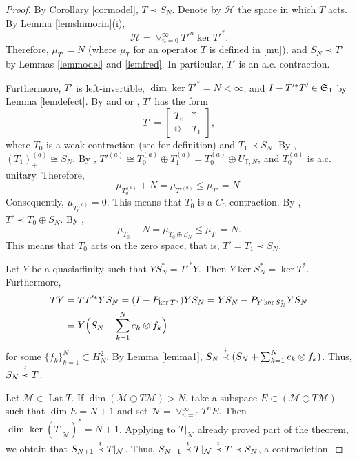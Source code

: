 \documentclass[a4paper,oneside,11pt]{amsart}
\numberwithin{equation}{section}
\theoremstyle{plain}
\theoremstyle{definition}
\begin{document}
\begin{proof} By Corollary \ref{cormodel}, $T\prec S_N$. Denote by $\mathcal H$ the space in which $T$ acts. By Lemma  \ref{lemshimorin}(i),  
\begin{equation*} \mathcal H=\vee_{n=0}^\infty T'^n\ker T'^*.
\end{equation*}
Therefore,  $\mu_{T'}=N$ (where $\mu_T$ for an operator $T$ is defined in \eqref{mu}), and $S_N\prec T'$ by Lemmas \ref{lemmodel} and \ref{lemfred}. In particular, $T'$ is an a.c. contraction. 

Furthermore, $T'$ is left-invertible, $\dim\ker T'^*=N<\infty$, and $I-T'^*T'\in\frak S_1$ by Lemma \ref{lemdefect}. By \cite{uchiyama84} and \cite{uchiyama83}  or \cite{takahashi84}, $T'$ has the form  
\begin{equation*} T'=\left[\begin{matrix}T_0 & * \\ \mathbb O & T_1\end{matrix}\right],
\end{equation*}
where $T_0$ is a weak contraction (see {\cite[Ch. VIII]{nfbk}} for definition) and $T_1\prec S_N$. 
By {\cite[Lemma 2.1]{gamalshiftindex}}, $(T_1)^{(a)}_+\cong S_N$. 
 By  {\cite[Ch. IX.1]{nfbk}}, 
$T'^{(a)}\cong T_0^{(a)}\oplus T_1^{(a)}=T_0^{(a)}\oplus U_{\mathbb T,N}$, and $T_0^{(a)}$ is a.c. unitary. Therefore, 
\begin{equation*} \mu_{T_0^{(a)}} + N =\mu_{T'^{(a)}}\leq \mu_{T'}=N. 
\end{equation*}
Consequently, $\mu_{T_0^{(a)}}=0$. This means that $T_0$ is a $C_0$-contraction. By {\cite[Theorem 0.1]{gamalaa03}}, 
$T'\prec T_0\oplus S_N$. By \cite{vasyuninkaraev},  
\begin{equation*} \mu_{T_0} + N =\mu_{T_0\oplus S_N}\leq \mu_{T'}=N. 
\end{equation*}
This means that $T_0$ acts on the zero space, that is, $T'=T_1\prec S_N$. 

Let $Y$ be a quasiaffinity such that $YS_N^*=T'^*Y$. Then $Y\ker S_N^*=\ker T^*$. 
Furthermore, 
\begin{align*} TY&=TT'^*YS_N=(I-P_{\ker T^*})YS_N=YS_N-P_{Y\ker S_N^*}YS_N\\&
=Y\Bigl(S_N +\sum_{k=1}^N e_k\otimes f_k\Bigr)
\end{align*}
for some $\{f_k\}_{k=1}^N\subset H^2_N$. By Lemma \ref{lemma1}, $S_N\buildrel i\over\prec (S_N +\sum_{k=1}^N e_k\otimes f_k)$. 
Thus, $S_N\buildrel i\over\prec T$.


Let $\mathcal M\in\operatorname{Lat}T$. If  $\dim( \mathcal M\ominus T\mathcal M)>N$, take a subspace 
$E\subset ( \mathcal M\ominus T\mathcal M)$ such that $\dim E=N+1$ and set  
$\mathcal N=\vee_{n=0}^\infty T^n E $.
Then $\dim\ker (T|_{\mathcal N})^*=N+1$. Applying to $T|_{\mathcal N}$ already proved part of the theorem, we obtain that $S_{N+1}\buildrel i\over\prec T|_{\mathcal N}$. 
Thus, $ S_{N+1}\buildrel i\over\prec T|_{\mathcal N}\buildrel i\over\prec T\prec S_N$, a contradiction.
\end{proof}
\end{document}
